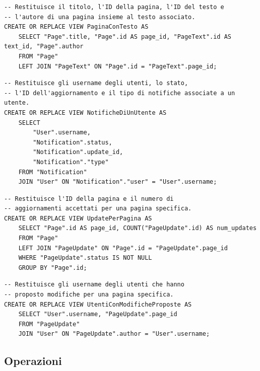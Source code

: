 \documentclass{article}
\begin{document}
\begin{lstlisting}[caption={Vista PaginaConTesto}, label={lst:pagina_con_testo}, style=SQL]
-- Restituisce il titolo, l'ID della pagina, l'ID del testo e 
-- l'autore di una pagina insieme al testo associato.
CREATE OR REPLACE VIEW PaginaConTesto AS
	SELECT "Page".title, "Page".id AS page_id, "PageText".id AS text_id, "Page".author
	FROM "Page"
	LEFT JOIN "PageText" ON "Page".id = "PageText".page_id;
\end{lstlisting}


\begin{lstlisting}[caption={Vista NotificheDiUnUtente}, label={lst:notifiche_di_un_utente}, style=SQL]
-- Restituisce gli username degli utenti, lo stato, 
-- l'ID dell'aggiornamento e il tipo di notifiche associate a un utente.
CREATE OR REPLACE VIEW NotificheDiUnUtente AS
	SELECT 
		"User".username, 
		"Notification".status, 
		"Notification".update_id,
		"Notification"."type"
	FROM "Notification"
	JOIN "User" ON "Notification"."user" = "User".username;
\end{lstlisting}

\newpage

\begin{lstlisting}[caption={Vista UpdatePerPagina}, label={lst:update_per_pagina}, style=SQL]
-- Restituisce l'ID della pagina e il numero di 
-- aggiornamenti accettati per una pagina specifica.
CREATE OR REPLACE VIEW UpdatePerPagina AS
	SELECT "Page".id AS page_id, COUNT("PageUpdate".id) AS num_updates
	FROM "Page"
	LEFT JOIN "PageUpdate" ON "Page".id = "PageUpdate".page_id
	WHERE "PageUpdate".status IS NOT NULL
	GROUP BY "Page".id;
\end{lstlisting}

\begin{lstlisting}[caption={Vista UtentiConModificheProposte}, label={lst:utenti_con_modifiche_proposte}, style=SQL]
-- Restituisce gli username degli utenti che hanno 
-- proposto modifiche per una pagina specifica.
CREATE OR REPLACE VIEW UtentiConModificheProposte AS
	SELECT "User".username, "PageUpdate".page_id
	FROM "PageUpdate"
	JOIN "User" ON "PageUpdate".author = "User".username;
\end{lstlisting}

\newpage

\subsection{Operazioni}
\end{document}
